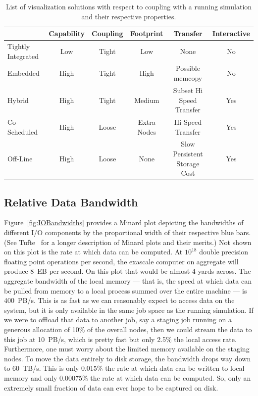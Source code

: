 \documentclass[conference]{IEEEtran}
\newcommand*{\scite}[1]{~\cite{#1}}
\begin{document}
\begin{table}
  \centering
  \caption{List of visualization solutions with respect to coupling with a
    running simulation and their respective properties.}
  \label{table:InSituSolutions}
  \begin{tabular}{@{}lccccc@{}}
    \toprule
    & Capability & Coupling & Footprint & Transfer & Interactive \\
    \midrule
    Tightly Integrated & Low & Tight & \textcolor{goodcolor}{Low} & \textcolor{goodcolor}{None} & No \\
    Embedded & \textcolor{goodcolor}{High} & Tight & High & Possible memcopy & No \\
    Hybrid & \textcolor{goodcolor}{High} & Tight & Medium & Subset Hi Speed Transfer & \textcolor{goodcolor}{Yes} \\
    Co-Scheduled & \textcolor{goodcolor}{High} & \textcolor{goodcolor}{Loose} & Extra Nodes & Hi Speed Transfer & \textcolor{goodcolor}{Yes} \\
    Off-Line & \textcolor{goodcolor}{High} & \textcolor{goodcolor}{Loose} & \textcolor{goodcolor}{None} & \textcolor{badcolor}{Slow Persistent Storage Cost} & \textcolor{goodcolor}{Yes} \\
    \bottomrule
  \end{tabular}
\end{table}

\subsection{Relative Data Bandwidth}

\noindent
Figure~\ref{fig:IOBandwidths} provides a Minard plot depicting the
bandwidths of different I/O components by the proportional width of their
respective blue bars.  (See Tufte\scite{Tufte2001} for a longer description
of Minard plots and their merits.)  Not shown on this plot is the rate at
which data can be computed.  At $10^{18}$ double precision floating point
operations per second, the exascale computer on aggregate will produce 8~EB
per second.  On this plot that would be almost 4 yards across.  The
aggregate bandwidth of the local memory --- that is, the speed at which
data can be pulled from memory to a local process summed over the entire
machine --- is 400~PB/s.  This is as fast as we can reasonably expect to
access data on the system, but it is only available in the same job space
as the running simulation.  If we were to offload that data to another job,
say a staging job running on a generous allocation of 10\% of the overall
nodes, then we could stream the data to this job at 10~PB/s, which is
pretty fast but only 2.5\% the local access rate.  Furthermore, one must
worry about the limited memory available on the staging nodes.  To move the
data entirely to disk storage, the bandwidth drops way down to 60~TB/s.
This is only 0.015\% the rate at which data can be written to local memory
and only 0.00075\% the rate at which data can be computed.  So, only an
extremely small fraction of data can ever hope to be captured on disk.
\end{document}
